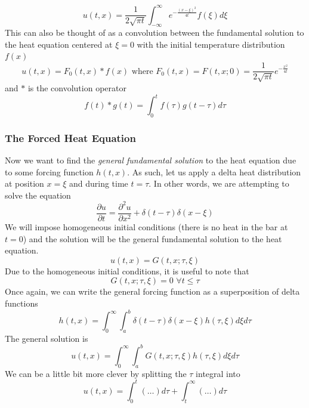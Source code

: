 \documentclass{article}
\newcommand{\pd}[2]{\frac{\partial #1}{\partial #2}}
\newcommand{\pdt}[2]{\frac{\partial ^2 #1}{\partial #2 ^2}}
\newcommand{\pull}{\! \! \!}
\newcommand{\gfsh}{G(t,x;\tau,\xi)}
\numberwithin{equation}{section}
\begin{document}
\begin{equation}
    u(t,x) =\frac{1}{2\sqrt{\pi t}}\int^\infty_{-\infty} e^{-\frac{(x-\xi)^2}{4t}}f(\xi)d\xi
\end{equation}
This can also be thought of as a convolution between the fundamental solution to the heat equation centered at $\xi =0$ with the initial temperature distribution $f(x)$
\begin{equation}
    u(t,x) =F_0(t,x) *f(x) \text{ where } F_0(t,x)=F(t,x;0) = \frac{1}{2\sqrt{\pi t}}e^{-\frac{x^2}{4t}}
\end{equation}
and $*$ is the convolution operator 
\begin{equation*}
    f(t)*g(t) =\int_0^tf(\tau)g(t-\tau)d\tau
\end{equation*}
\subsubsection{The Forced Heat Equation} 
Now we want to find the \textit{general fundamental solution} to the heat equation due to some forcing function $h(t,x)$. As such, let us apply a delta heat distribution at position $x=\xi$ and during time $t=\tau$. In other words, we are attempting to solve the equation
\begin{equation*}
    \pd{u}{t} = \pdt{u}{x} +\delta(t-\tau)\delta(x-\xi)
\end{equation*}
We will impose homogeneous initial conditions (there is no heat in the bar at $t=0$) and the solution will be the general fundamental solution to the heat equation.
\begin{equation*}
    u(t,x) = \gfsh
\end{equation*}
Due to the homogeneous initial conditions, it is useful to note that 
\begin{equation}
    \gfsh =0 \hspace{4pt} \forall t\leq \tau \label{eq:3.10}
\end{equation}
Once again, we can write the general forcing function as a superposition of delta functions 
\begin{equation}
h(t,x) =\int^\infty_0 \pull \int^b_a\delta (t-\tau)\delta(x-\xi)h(\tau,\xi) d\xi d\tau
\end{equation}
The general solution is 
\begin{equation*}
    u(t,x) = \int_0^\infty\pull \int^b_a \gfsh h(\tau, \xi)d\xi d\tau 
\end{equation*}
We can be a little bit more clever by splitting the $\tau$ integral into 
\begin{equation*}
    u(t,x) = \int^t_0(\ldots)d\tau +\int_t^\infty(\ldots)d\tau
\end{equation*}
\end{document}
